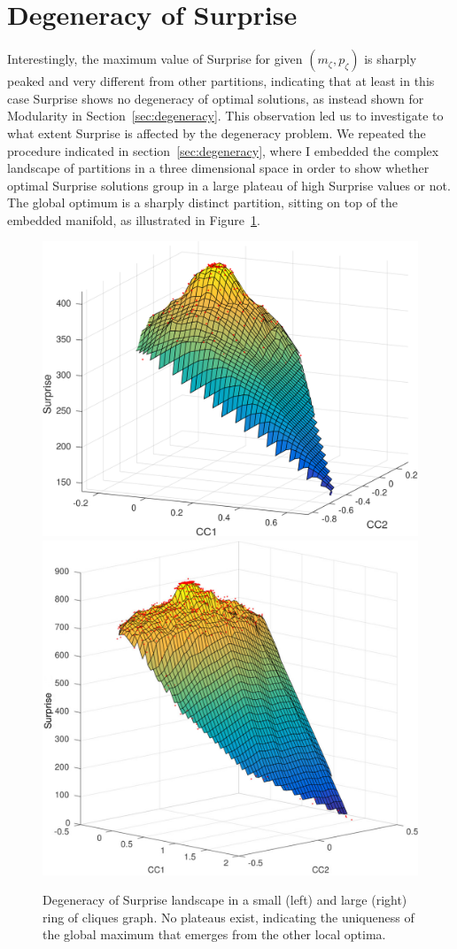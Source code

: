 \section{Degeneracy of Surprise}\label{sec:degeneracy_surprise}
Interestingly, the maximum value of Surprise for given $(m_\zeta,p_\zeta)$ is sharply peaked and very different from other partitions, indicating that at least in this case Surprise shows no degeneracy of optimal solutions, as instead shown for Modularity in Section~\ref{sec:degeneracy}.
This observation led us to investigate to what extent Surprise is affected by the degeneracy problem.
We repeated the procedure indicated in section~\ref{sec:degeneracy}, where I embedded the complex landscape of partitions in a three dimensional space in order to show whether optimal Surprise solutions group in a large plateau of high Surprise values or not. The global optimum is a sharply distinct partition, sitting on top of the embedded manifold, as illustrated in Figure~\ref{fig:degeneracy_surprise}.
\begin{figure}[ht]
\centering
\includegraphics[height=0.4\textwidth]{images/degeneracy_surprise_n_5_c_24.png}\hfill
\includegraphics[height=0.4\textwidth]{images/degeneracy_surprise_n6_c30.png}
\caption{Degeneracy of Surprise landscape in a small (left) and large (right) ring of cliques graph. No plateaus exist, indicating the uniqueness of the global maximum that emerges from the other local optima.}
\label{fig:degeneracy_surprise}
\end{figure}

